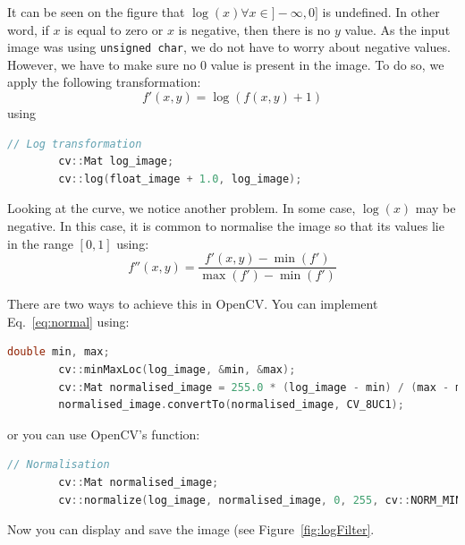 \documentclass[english,a4paper,12pt,oneside]{article}
\begin{document}
It can be seen on the figure that $\log(x) \forall x \in ]-\infty,  0]$ is undefined. 
In other word, if $x$ is equal to zero or $x$ is negative, then there is no $y$ value. 
As the input image was using \verb+unsigned char+, we do not have to worry about negative values. 
However, we have to make sure no $0$ value is present in the image. 
To do so, we apply the following transformation:
\begin{equation}f'(x,y) = \log(f(x,y) + 1)\end{equation}
using
\begin{lstlisting}[language=c++]
        // Log transformation
        cv::Mat log_image;
        cv::log(float_image + 1.0, log_image);
\end{lstlisting}

Looking at the curve, we notice another problem. 
In some case, $\log(x)$ may be negative. 
In this case, it is common to normalise the image so that its values lie in the range $[0, 1]$ using:
\begin{equation}f''(x,y) = \frac{f'(x,y) - \min(f')}{\max(f') - \min(f')}\label{eq:normal}\end{equation}

There are two ways to achieve this in OpenCV.
You can implement Eq.~\ref{eq:normal} using:
\begin{lstlisting}[language=c++]
        double min, max;
        cv::minMaxLoc(log_image, &min, &max);
        cv::Mat normalised_image = 255.0 * (log_image - min) / (max - min);
        normalised_image.convertTo(normalised_image, CV_8UC1);
\end{lstlisting}
or you can use OpenCV's function:
\begin{lstlisting}[language=c++]
        // Normalisation
        cv::Mat normalised_image;
        cv::normalize(log_image, normalised_image, 0, 255, cv::NORM_MINMAX, CV_8UC1);
\end{lstlisting}

Now you can display and save the image (see Figure~\ref{fig:logFilter}.
    
\end{document}
